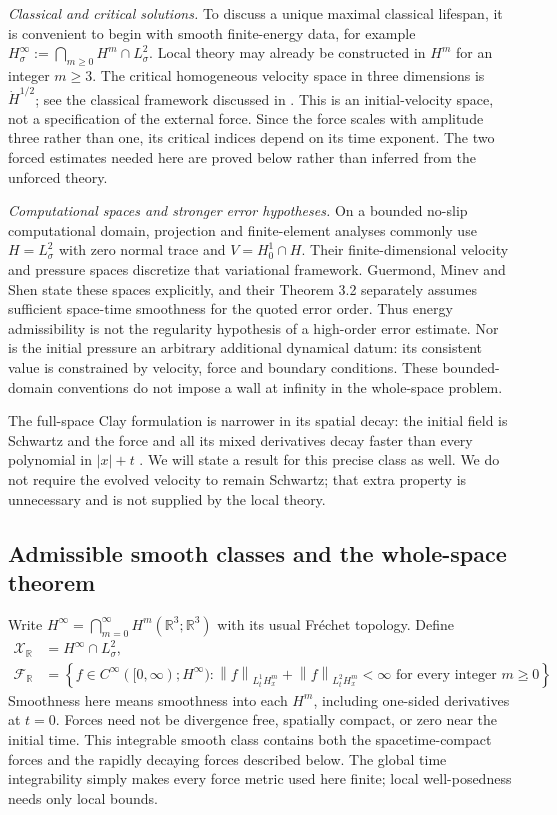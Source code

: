 \documentclass[11pt,a4paper]{article}
\theoremstyle{definition}\newtheorem{definition}[theorem]{Definition}
\theoremstyle{remark}\newtheorem{remark}[theorem]{Remark}
\newcommand{\R}{\mathbb R}\newcommand{\TT}{\mathbb T^3}
\newcommand{\norm}[1]{\left\lVert#1\right\rVert}
\begin{document}
\emph{Classical and critical solutions.} To discuss a unique maximal classical lifespan, it is convenient to begin with smooth finite-energy data, for example $H^\infty_\sigma:=\bigcap_{m\ge0}H^m\cap L^2_\sigma$. Local theory may already be constructed in $H^m$ for an integer $m\ge3$. The critical homogeneous velocity space in three dimensions is $\dot H^{1/2}$; see the classical framework discussed in \cite{fujita,tao2018}. This is an initial-velocity space, not a specification of the external force. Since the force scales with amplitude three rather than one, its critical indices depend on its time exponent. The two forced estimates needed here are proved below rather than inferred from the unforced theory.

\emph{Computational spaces and stronger error hypotheses.} On a bounded no-slip computational domain, projection and finite-element analyses commonly use $H=L^2_\sigma$ with zero normal trace and $V=H^1_0\cap H$. Their finite-dimensional velocity and pressure spaces discretize that variational framework. Guermond, Minev and Shen \cite[Section 2]{gms} state these spaces explicitly, and their Theorem 3.2 separately assumes sufficient space-time smoothness for the quoted error order. Thus energy admissibility is not the regularity hypothesis of a high-order error estimate. Nor is the initial pressure an arbitrary additional dynamical datum: its consistent value is constrained by velocity, force and boundary conditions. These bounded-domain conventions do not impose a wall at infinity in the whole-space problem.

The full-space Clay formulation is narrower in its spatial decay: the initial field is Schwartz and the force and all its mixed derivatives decay faster than every polynomial in $|x|+t$ \cite[equations (4)--(5)]{clay}. We will state a result for this precise class as well. We do not require the evolved velocity to remain Schwartz; that extra property is unnecessary and is not supplied by the local theory.

\subsection{Admissible smooth classes and the whole-space theorem}
Write $H^\infty=\bigcap_{m=0}^\infty H^m(\R^3;\R^3)$ with its usual Fr\'echet topology. Define
\begin{align}
 \mathcal X_{\R}&=H^\infty\cap L^2_\sigma,\nonumber\\
 \mathcal F_{\R}&=\left\{f\in C^\infty([0,\infty);H^\infty):
 \norm{f}_{L^1_tH^m_x}+\norm{f}_{L^2_tH^m_x}<\infty
 \text{ for every integer }m\ge0\right\}.\label{eq:Rclasses}
\end{align}
Smoothness here means smoothness into each $H^m$, including one-sided derivatives at $t=0$. Forces need not be divergence free, spatially compact, or zero near the initial time. This integrable smooth class contains both the spacetime-compact forces and the rapidly decaying forces described below. The global time integrability simply makes every force metric used here finite; local well-posedness needs only local bounds.
\end{document}
